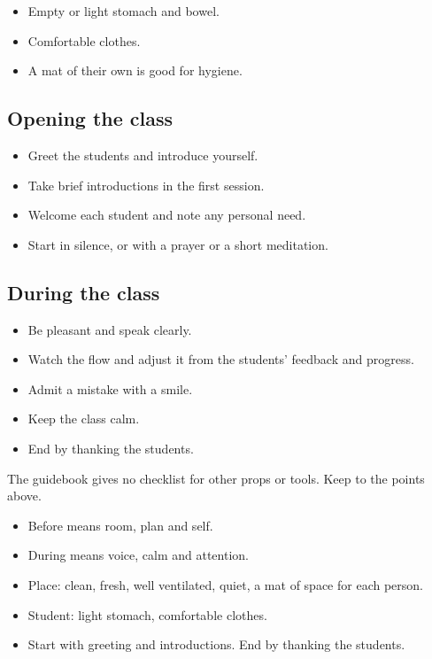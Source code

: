 \begin{itemize}
\item Empty or light stomach and bowel.
\item Comfortable clothes.
\item A mat of their own is good for hygiene.
\end{itemize}

\subsection*{Opening the class}

\begin{itemize}
\item Greet the students and introduce yourself.
\item Take brief introductions in the first session.
\item Welcome each student and note any personal need.
\item Start in silence, or with a prayer or a short meditation.
\end{itemize}

\subsection*{During the class}

\begin{itemize}
\item Be pleasant and speak clearly.
\item Watch the flow and adjust it from the students' feedback and progress.
\item Admit a mistake with a smile.
\item Keep the class calm.
\item End by thanking the students.
\end{itemize}

The guidebook gives no checklist for other props or tools. Keep to the points above.

\begin{recall}
\begin{itemize}
\item Before means room, plan and self.
\item During means voice, calm and attention.
\item Place: clean, fresh, well ventilated, quiet, a mat of space for each person.
\item Student: light stomach, comfortable clothes.
\item Start with greeting and introductions. End by thanking the students.
\end{itemize}
\end{recall}

